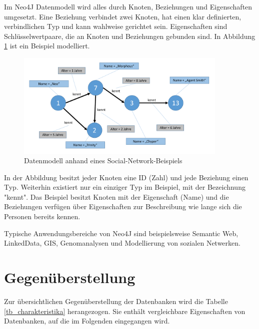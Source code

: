 Im Neo4J Datenmodell wird alles durch Knoten, Beziehungen und Eigenschaften umgesetzt. Eine Beziehung verbindet zwei Knoten, hat einen klar definierten, verbindlichen Typ und kann wahlweise gerichtet sein. Eigenschaften sind Schlüsselwertpaare, die an Knoten und Beziehungen gebunden sind. In Abbildung \ref{db_neo4J} ist ein Beispiel modelliert.

\begin{figure}[htbp]
\centering
  \includegraphics[width=0.9\textwidth, width=0.9\textwidth]{pics/neo4J.pdf}
\caption{Datenmodell anhand eines Social-Network-Beispiels}
\label{db_neo4J}
\end{figure} 

In der Abbildung besitzt jeder Knoten eine ID (Zahl) und jede Beziehung  einen Typ. Weiterhin existiert nur ein einziger Typ im Beispiel, mit der Bezeichnung "kennt". Das Beispiel besitzt Knoten mit der Eigenschaft (Name) und die Beziehungen verfügen über Eigenschaften zur Beschreibung wie lange sich die Personen bereits kennen. 

Typische Anwendungsbereiche von Neo4J sind beispielsweise Semantic Web, LinkedData, GIS, Genomanalysen und Modellierung von sozialen Netwerken.

\section{Gegenüberstellung} 
\label{ch:AnalyseDatenbanken:sec:Gegenüberstellung}

Zur übersichtlichen Gegenüberstellung der Datenbanken wird die Tabelle \ref{tb_charakteristika} herangezogen. Sie enthält vergleichbare Eigenschaften von Datenbanken, auf die im Folgenden eingegangen wird. 

